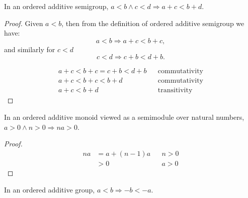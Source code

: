 \begin{lemma}
	In an ordered additive semigroup, $a < b \wedge c < d \Rightarrow a + c < b + d$.
\end{lemma}

\begin{proof}
	Given $a < b$, then from the definition of ordered additive semigroup we have:
	\[ a < b \Rightarrow a + c < b + c, \]
	and similarly for $c < d$
	\[ c < d \Rightarrow c + b < d + b. \]

	\begin{align*}
		a + c < b + c = c + b < d + b && \text{commutativity}\\
		a + c < b + c < b + d && \text{commutativity}\\
		a + c < b + d && \text{transitivity}
	\end{align*}
\end{proof}

\begin{lemma}
	In an ordered additive monoid viewed as a semimodule over natural numbers,
	$a > 0 \wedge n > 0 \Rightarrow na > 0$.
\end{lemma}

\begin{proof}
	\begin{align*}
		na &= a + (n - 1)a && n > 0\\
		   &> 0 && a > 0
	\end{align*}
\end{proof}

\begin{lemma}
	In an ordered additive group, $a < b \Rightarrow -b < -a$.
\end{lemma}
